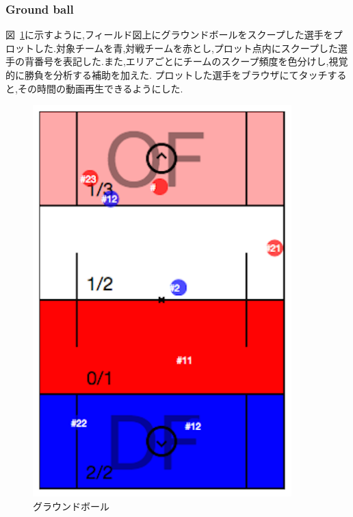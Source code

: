 \documentclass[sotsuron]{kuee}
\begin{document}
			\subsubsection{Ground ball}
				図~\ref{fig:gb}に示すように,フィールド図上にグラウンドボールをスクープした選手をプロットした.対象チームを青,対戦チームを赤とし,プロット点内にスクープした選手の背番号を表記した.また,エリアごとにチームのスクープ頻度を色分けし,視覚的に勝負を分析する補助を加えた.
				プロットした選手をブラウザにてタッチすると,その時間の動画再生できるようにした.
					\begin{figure}
						\begin{center}
							\includegraphics[width=10cm]{./png/gb.png}
						\end{center}
						\caption{グラウンドボール}
				  		\label{fig:gb}
					\end{figure}
\end{document}
